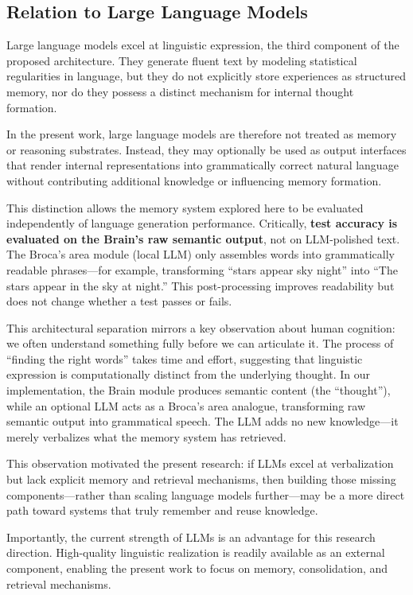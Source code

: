 \documentclass[11pt]{article}
\begin{document}
\subsection{Relation to Large Language Models}

Large language models excel at linguistic expression, the third component of the proposed architecture. They generate fluent text by modeling statistical regularities in language, but they do not explicitly store experiences as structured memory, nor do they possess a distinct mechanism for internal thought formation.

In the present work, large language models are therefore not treated as memory or reasoning substrates. Instead, they may optionally be used as output interfaces that render internal representations into grammatically correct natural language without contributing additional knowledge or influencing memory formation.

This distinction allows the memory system explored here to be evaluated independently of language generation performance. Critically, \textbf{test accuracy is evaluated on the Brain's raw semantic output}, not on LLM-polished text. The Broca's area module (local LLM) only assembles words into grammatically readable phrases---for example, transforming ``stars appear sky night'' into ``The stars appear in the sky at night.'' This post-processing improves readability but does not change whether a test passes or fails.

This architectural separation mirrors a key observation about human cognition: we often understand something fully before we can articulate it. The process of ``finding the right words'' takes time and effort, suggesting that linguistic expression is computationally distinct from the underlying thought. In our implementation, the Brain module produces semantic content (the ``thought''), while an optional LLM acts as a Broca's area analogue, transforming raw semantic output into grammatical speech. The LLM adds no new knowledge---it merely verbalizes what the memory system has retrieved.

This observation motivated the present research: if LLMs excel at verbalization but lack explicit memory and retrieval mechanisms, then building those missing components---rather than scaling language models further---may be a more direct path toward systems that truly remember and reuse knowledge.

Importantly, the current strength of LLMs is an advantage for this research direction. High-quality linguistic realization is readily available as an external component, enabling the present work to focus on memory, consolidation, and retrieval mechanisms.
\end{document}
